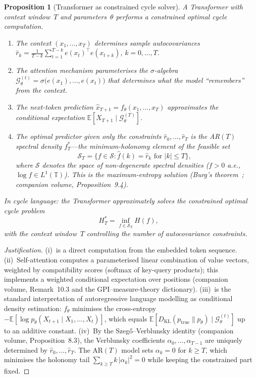 \documentclass[11pt,a4paper]{article}
\newtheorem{proposition}[theorem]{Proposition}
\theoremstyle{definition}
\theoremstyle{remark}
\begin{document}
\begin{proposition}[Transformer as constrained cycle solver]
\label{prop:transformer-cycle}
A Transformer with context window~$T$ and parameters~$\theta$
performs a constrained optimal cycle computation.
\begin{enumerate}[label=(\roman*)]
\item The context $(x_1, \ldots, x_T)$ determines sample
  autocovariances
  $\hat{r}_k = \frac{1}{T-k}
  \sum_{t=1}^{T-k} e(x_t)^\top\! e(x_{t+k})$,
  $k = 0, \ldots, T$.
\item The attention mechanism parameterises the
  $\sigma$-algebra
  $\mathcal{G}_\theta^{(t)} = \sigma\!\bigl(e(x_1),\ldots,e(x_t)\bigr)$
  that determines what the model ``remembers'' from the context.
\item The next-token prediction
  $\hat{x}_{T+1} = f_\theta(x_1, \ldots, x_T)$
  approximates the conditional expectation
  $\mathbb{E}[X_{T+1} \mid \mathcal{G}_\theta^{(T)}]$.
\item The optimal predictor given only the constraints
  $\hat{r}_0, \ldots, \hat{r}_T$ is the AR$(T)$ spectral density
  $f_T^*$---the minimum-holonomy element of the feasible set
  \[
    \mathcal{S}_T = \bigl\{f \in \mathcal{S} :
    \hat{f}(k) = \hat{r}_k \text{ for } |k| \leq T\bigr\},
  \]
  where $\mathcal{S}$ denotes the space of non-degenerate spectral
  densities ($f > 0$ a.e., $\log f \in L^1(\mathbb{T})$).
  This is the maximum-entropy solution
  (Burg's theorem~\cite{burg1975};
  companion volume, Proposition~9.4).
\end{enumerate}
In cycle language: the Transformer approximately solves the
constrained optimal cycle problem
\[
  H_T^* = \inf_{f \in \mathcal{S}_T} H(f),
\]
with the context window~$T$ controlling the number of
autocovariance constraints.
\end{proposition}

\begin{proof}[Justification]
(i)~is a direct computation from the embedded token sequence.
(ii)~Self-attention computes a parameterised linear combination
of value vectors, weighted by compatibility scores
(softmax of key-query products); this implements a weighted
conditional expectation over positions
(companion volume, Remark~10.3 and the
GPI--measure-theory dictionary).
(iii)~is the standard interpretation of autoregressive language
modelling as conditional density estimation:
$f_\theta$ minimises the cross-entropy
$-\mathbb{E}[\log p_\theta(X_{t+1} \mid X_1, \ldots, X_t)]$,
which equals $\mathbb{E}[D_{\mathrm{KL}}(p_{\mathrm{true}} \|
p_\theta) \mid \mathcal{G}_\theta^{(t)}]$ up to an additive
constant.
(iv)~By the Szeg\H{o}--Verblunsky identity
(companion volume, Proposition~8.3), the Verblunsky coefficients
$\alpha_0, \ldots, \alpha_{T-1}$ are uniquely determined by
$\hat{r}_0, \ldots, \hat{r}_T$.
The AR$(T)$ model sets $\alpha_k = 0$ for $k \geq T$, which
minimises the holonomy tail
$\sum_{k \geq T} k\,|\alpha_k|^2 = 0$
while keeping the constrained part fixed.
\end{proof}
\end{document}
